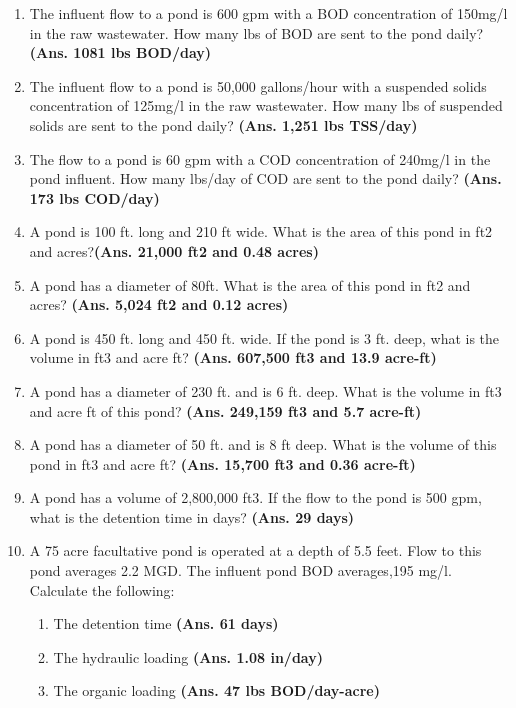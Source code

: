 \begin{enumerate}
\item The influent flow to a pond is 600 gpm with a BOD concentration of 150mg/l in the raw wastewater. How many lbs of BOD are sent to the pond daily? \textbf{(Ans. 1081 lbs BOD/day)}

\item The influent flow to a pond is 50,000 gallons/hour with a suspended solids concentration of 125mg/l in the raw wastewater.  How many lbs of suspended solids are sent to the pond daily? \textbf{(Ans. 1,251 lbs TSS/day)}

\item The flow to a pond is 60 gpm with a COD concentration of 240mg/l in the pond influent. How many lbs/day of COD are sent to the pond daily? \textbf{(Ans. 173 lbs COD/day)}

\item A pond is 100 ft. long and 210 ft wide. What is the area of this pond in ft2 and acres?\textbf{(Ans. 21,000 ft2 and 0.48 acres)}

\item A pond has a diameter of 80ft. What is the area of this pond in ft2 and acres? \textbf{(Ans. 5,024 ft2 and 0.12 acres)}

\item A pond is 450 ft. long and 450 ft. wide. If the pond is 3 ft. deep, what is the volume in ft3 and acre ft? \textbf{(Ans. 607,500 ft3 and 13.9 acre-ft)}

\item A pond has a diameter of 230 ft. and is 6 ft. deep.  What is the volume in ft3 and acre ft of this pond? \textbf{(Ans. 249,159 ft3 and 5.7 acre-ft)}

\item A pond has a diameter of 50 ft. and is 8 ft deep.  What is the volume of this pond in ft3 and acre ft?  \textbf{(Ans. 15,700 ft3 and 0.36 acre-ft)}

\item A pond has a volume of 2,800,000 ft3. If the flow to the pond is 500 gpm, what is the detention time in days? \textbf{(Ans. 29 days)}

\item A 75 acre facultative pond is operated at a depth of 5.5 feet. Flow to this pond averages 2.2 MGD. The influent pond BOD averages,195 mg/l. Calculate the following:
\begin{enumerate}
\item The detention time \textbf{(Ans. 61 days)}
\item The hydraulic loading \textbf{(Ans. 1.08 in/day)}
\item The organic loading \textbf{(Ans. 47 lbs BOD/day-acre)}
\end{enumerate}



\end{enumerate}
